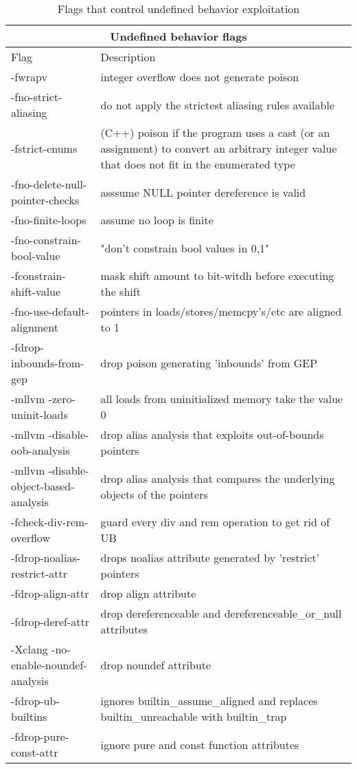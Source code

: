 \begin{table}[H]
\centering
\begin{tabular}{ |p{5cm}|p{7cm}|  }
 \hline
 \multicolumn{2}{|c|}{Undefined behavior flags} \\
 \hline
 Flag & Description\\
 \hline
 \hline
-fwrapv & integer overflow does not generate poison\\
 \hline
-fno-strict-aliasing & do not apply the strictest aliasing rules available\\
 \hline
-fstrict-enums & (C++) poison if the program uses a cast (or an assignment) to convert an arbitrary integer value that does not fit in the enumerated type\\
 \hline
-fno-delete-null-pointer-checks & asssume NULL pointer dereference is valid\\
 \hline
-fno-finite-loops & assume no loop is finite\\
 \hline
-fno-constrain-bool-value & "don't constrain bool values in {0,1}"\\
 \hline
-fconstrain-shift-value & mask shift amount to bit-witdh before executing the shift\\
 \hline
-fno-use-default-alignment & pointers in loads/stores/memcpy's/etc are aligned to 1\\
 \hline
-fdrop-inbounds-from-gep & drop poison generating 'inbounds' from GEP\\
 \hline
-mllvm -zero-uninit-loads & all loads from uninitialized memory take the value 0\\
 \hline
-mllvm -disable-oob-analysis & drop alias analysis that exploits out-of-bounds pointers\\
 \hline
-mllvm -disable-object-based-analysis & drop alias analysis that compares the underlying objects of the pointers\\
 \hline
-fcheck-div-rem-overflow & guard every div and rem operation to get rid of UB\\
 \hline
-fdrop-noalias-restrict-attr & drops noalias attribute generated by 'restrict' pointers\\
 \hline
-fdrop-align-attr & drop align attribute\\
 \hline
-fdrop-deref-attr & drop dereferenceable and dereferenceable_or_null attributes\\
 \hline
-Xclang -no-enable-noundef-analysis & drop noundef attribute\\
 \hline
-fdrop-ub-builtins & ignores builtin_assume_aligned and replaces builtin_unreachable with builtin_trap\\
 \hline
-fdrop-pure-const-attr & ignore pure and const function attributes\\
 \hline
\end{tabular}
\caption{\label{tab:flags} Flags that control undefined behavior exploitation}
\end{table}
